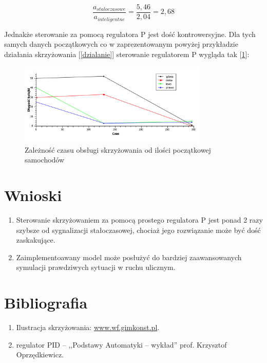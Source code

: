 \documentclass[11pt]{aghdpl}
\begin{document}
\begin{equation}
	\frac{a_{staloczasowe}}{a_{inteligentne}} = \frac{5,46}{2,04} = 2,68
\end{equation}

Jednakże sterowanie za pomocą regulatora P jest dość kontrowersyjne. Dla tych samych danych początkowych co w zaprezentowanym powyżej przykładzie działania skrzyżowania [\ref{dzialanie}] sterowanie regulatorem P wygląda tak [\ref{dzialanie2}]:
\begin{figure}[h!]
	\centering
	\includegraphics[width=0.80\textwidth]{dzialanie2.pdf}
	\caption{Zależność czasu obsługi skrzyżowania od ilości początkowej samochodów}	
	\label{dzialanie2}
\end{figure}

\section{Wnioski}
\begin{enumerate}
	\item Sterowanie skrzyżowaniem za pomocą prostego regulatora P jest ponad 2 razy szybsze od sygnalizacji stałoczasowej, chociaż jego rozwiązanie może być dość zaskakujące.
	\item Zaimplementoawany model może posłużyć do bardziej  zaawansowanych symulacji prawdziwych sytuacji w ruchu ulicznym.
\end{enumerate}

\section{Bibliografia}
\begin{enumerate}
\item Ilustracja skrzyżowania: \href{http://www.wf.gimkonst.pl/viewpage.php?page_id=50}{ www.wf.gimkonst.pl}.
\item regulator PID -- ,,Podstawy Automatyki -- wykład'' prof. Krzysztof Oprzędkiewicz.

\end{enumerate}
\end{document}
